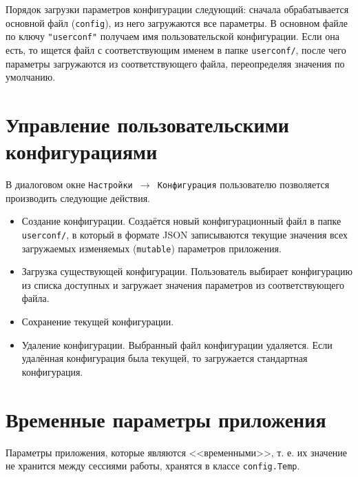\documentclass[fontsize=10px, a4paper, openany]{scrbook}
\begin{document}
Порядок загрузки параметров конфигурации следующий: сначала обрабатывается основной файл (\texttt{config}), из него загружаются все параметры. В основном файле по ключу \texttt{"userconf"} получаем имя пользовательской конфигурации. Если она есть, то ищется файл с соответствующим именем в папке \texttt{userconf/}, после чего параметры загружаются из соответствующего файла, переопределяя значения по умолчанию.

\section{Управление пользовательскими конфигурациями}

В диалоговом окне \texttt{Настройки $\rightarrow$ Конфигурация} пользователю позволяется производить следующие действия.
\begin{itemize}
\item Создание конфигурации. Создаётся новый конфигурационный файл в папке \texttt{userconf/}, в который в формате JSON записываются текущие значения всех загружаемых изменяемых (\texttt{mutable}) параметров приложения.
\item Загрузка существующей конфигурации. Пользователь выбирает конфигурацию из списка доступных и загружает значения параметров из соответствующего файла.
\item Сохранение текущей конфигурации.
\item Удаление конфигурации. Выбранный файл конфигурации удаляется. Если удалённая конфигурация была текущей, то загружается стандартная конфигурация.
\end{itemize}

\section{Временные параметры приложения}
Параметры приложения, которые являются <<временными>>, т. е. их значение не хранится между сессиями работы, хранятся в классе \texttt{config.Temp}.
\end{document}
